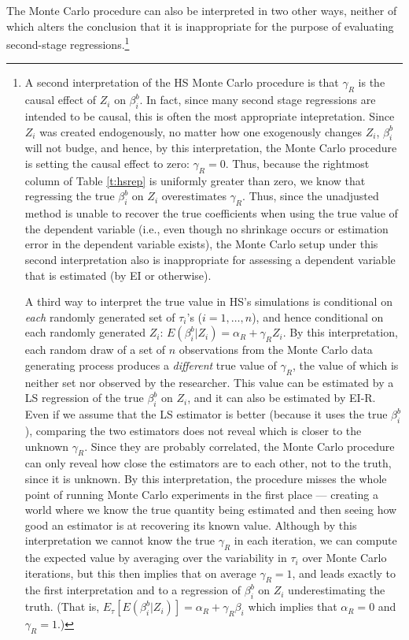 \documentclass[11pt,titlepage]{article}
\begin{document}
The Monte Carlo procedure can also be interpreted in two other ways,
neither of which alters the conclusion that it is inappropriate for
the purpose of evaluating second-stage regressions.\footnote{A second
  interpretation of the HS Monte Carlo procedure is that $\gamma_R$ is
  the causal effect of $Z_i$ on $\beta_i^b$.  In fact, since many
  second stage regressions are intended to be causal, this is often
  the most appropriate intepretation.  Since $Z_i$ was created
  endogenously, no matter how one exogenously changes $Z_i$,
  $\beta_i^b$ will not budge, and hence, by this interpretation, the
  Monte Carlo procedure is setting the causal effect to zero:
  $\gamma_R=0$.  Thus, because the rightmost column of Table
  \ref{t:hsrep} is uniformly greater than zero, we know that
  regressing the true $\beta_i^b$ on $Z_i$ overestimates $\gamma_R$.
  Thus, since the unadjusted method is unable to recover the true
  coefficients when using the true value of the dependent variable
  (i.e., even though no shrinkage occurs or estimation error in the
  dependent variable exists), the Monte Carlo setup under this second
  interpretation also is inappropriate for assessing a dependent
  variable that is estimated (by EI or otherwise).
  
  A third way to interpret the true value in HS's simulations is
  conditional on \emph{each} randomly generated set of $\tau_i$'s
  ($i=1,\dots,n$), and hence conditional on each randomly generated
  $Z_i$: $E(\beta_i^b|Z_i)=\alpha_R+\gamma_R Z_i$.  By this
  interpretation, each random draw of a set of $n$ observations from
  the Monte Carlo data generating process produces a \emph{different}
  true value of $\gamma_R$, the value of which is neither set nor
  observed by the researcher.  This value can be estimated by a LS
  regression of the true $\beta_i^b$ on $Z_i$, and it can also be
  estimated by EI-R.  Even if we assume that the LS estimator is
  better (because it uses the true $\beta_i^b$), comparing the two
  estimators does not reveal which is closer to the unknown
  $\gamma_R$.  Since they are probably correlated, the Monte Carlo
  procedure can only reveal how close the estimators are to each
  other, not to the truth, since it is unknown.  By this
  interpretation, the procedure misses the whole point of running
  Monte Carlo experiments in the first place --- creating a world
  where we know the true quantity being estimated and then seeing how
  good an estimator is at recovering its known value.  Although by
  this interpretation we cannot know the true $\gamma_R$ in each
  iteration, we can compute the expected value by averaging over the
  variability in $\tau_i$ over Monte Carlo iterations, but this then
  implies that on average $\gamma_R=1$, and leads exactly to the first
  interpretation and to a regression of $\beta_i^b$ on $Z_i$
  underestimating the truth.  (That is,
  $E_\tau[E(\beta_i^b|Z_i)]=\alpha_R+\gamma_R \beta_i$ which implies
  that $\alpha_R=0$ and $\gamma_R=1$.)}
\end{document}
